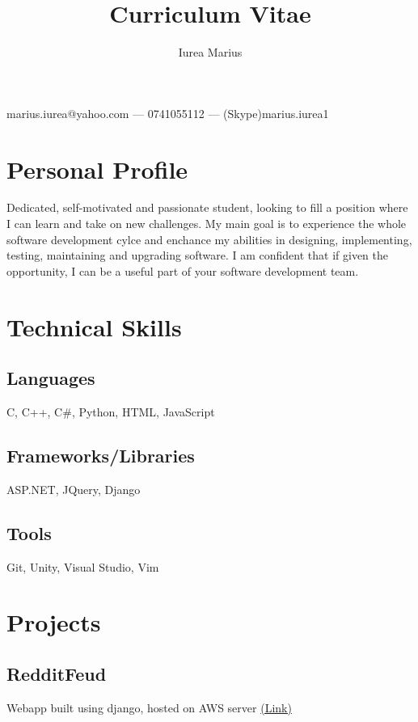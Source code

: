\documentclass[a4paper,hidelinks,12pt]{article}
\begin{document}
\title{Curriculum Vitae}
\author{Iurea Marius}
\renewcommand{\maketitle}
{
        \begin{center}
        {\huge\bfseries
        \thetitle

        \theauthor}

        marius.iurea@yahoo.com --- 0741055112 --- (Skype)marius.iurea1

        \end{center}
}

\maketitle

\section{Personal Profile}
Dedicated, self-motivated and passionate student, looking to fill a position where I can learn and take on new
challenges. My main goal is to experience the whole software development cylce and enchance my abilities in 
designing, implementing, testing, maintaining and upgrading software. I am confident that if given the 
opportunity, I can be a useful part of your software development team.


\section{Technical Skills}
\subsection{Languages}
C, C++, C\#, Python, HTML, JavaScript
\subsection{Frameworks/Libraries}
ASP.NET, JQuery, Django
\subsection{Tools}
Git, Unity, Visual Studio, Vim
\section{Projects}
\subsection{RedditFeud}
Webapp built using django, hosted on AWS server \href{https:\\www.redditfeud.com}{(Link)}
\end{document}
